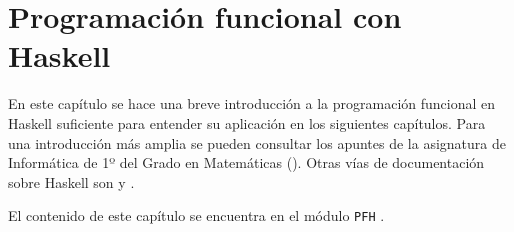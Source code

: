 \chapter{Programación funcional con Haskell}

En este capítulo se hace una breve introducción a la programación funcional en
Haskell suficiente para entender su aplicación en los siguientes
capítulos. Para una introducción más amplia se pueden consultar los apuntes de
la asignatura de Informática de 1º del Grado en Matemáticas
(\cite{Alonso-15b}). Otras vías de documentación sobre Haskell son \cite{Hutton-16} y \cite{Haskell2010}.

El contenido de este capítulo se encuentra en el módulo \texttt{PFH} 
.

